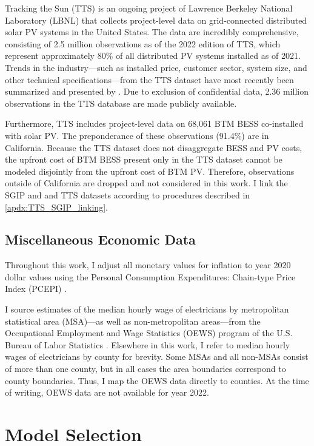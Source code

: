\documentclass[preprint,12pt,authoryear]{elsarticle}
\begin{document}
Tracking the Sun (TTS) \citep{TTS2022} is an ongoing project of Lawrence Berkeley National Laboratory (LBNL) that collects project-level data on grid-connected distributed solar PV systems in the United States. The data are incredibly comprehensive, consisting of 2.5 million observations as of the 2022 edition of TTS, which represent approximately 80\% of all distributed PV systems installed as of 2021. Trends in the industry---such as installed price, customer sector, system size, and other technical specifications---from the TTS dataset have most recently been summarized and presented by \citet{TTS2022}. Due to exclusion of confidential data, 2.36 million observations in the TTS database are made publicly available.

Furthermore, TTS includes project-level data on 68,061 BTM BESS co-installed with solar PV. The preponderance of these observations (91.4\%) are in California. Because the TTS dataset does not disaggregate BESS and PV costs, the upfront cost of BTM BESS present only in the TTS dataset cannot be modeled disjointly from the upfront cost of BTM PV. Therefore, observations outside of California are dropped and not considered in this work. I link the SGIP and and TTS datasets according to procedures described in \ref{apdx:TTS_SGIP_linking}.

\subsection{Miscellaneous Economic Data}\label{sec:misc_data}

Throughout this work, I adjust all monetary values for inflation to year 2020 dollar values using the Personal Consumption Expenditures: Chain-type Price Index (PCEPI) .

I source estimates of the median hourly wage of electricians by metropolitan statistical area (MSA)---as well as non-metropolitan areas---from the Occupational Employment and Wage Statistics (OEWS) program of the U.S. Bureau of Labor Statistics . Elsewhere in this work, I refer to median hourly wages of electricians by county for brevity. Some MSAs and all non-MSAs consist of more than one county, but in all cases the area boundaries correspond to county boundaries. Thus, I map the OEWS data directly to counties. At the time of writing, OEWS data are not available for year 2022.

\section{Model Selection}\label{sec:model_selection}
\end{document}
